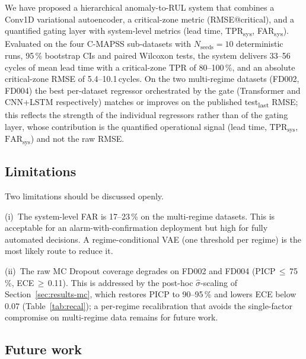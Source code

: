 \documentclass[5p,times,authoryear]{elsarticle}
\begin{document}
We have proposed a hierarchical anomaly-to-RUL system that combines a Conv1D variational autoencoder, a critical-zone metric (RMSE@critical), and a quantified gating layer with system-level metrics (lead time, TPR\textsubscript{sys}, FAR\textsubscript{sys}). Evaluated on the four C-MAPSS sub-datasets with $N_{\mathrm{seeds}}{=}10$ deterministic runs, 95\,\% bootstrap CIs and paired Wilcoxon tests, the system delivers 33--56\,cycles of mean lead time with a critical-zone TPR of 80--100\,\%, and an absolute critical-zone RMSE of 5.4--10.1\,cycles. On the two multi-regime datasets (FD002, FD004) the best per-dataset regressor orchestrated by the gate (Transformer and CNN+LSTM respectively) matches or improves on the published test\textsubscript{last} RMSE; this reflects the strength of the individual regressors rather than of the gating layer, whose contribution is the quantified operational signal (lead time, $\mathrm{TPR}_{\mathrm{sys}}$, $\mathrm{FAR}_{\mathrm{sys}}$) and not the raw RMSE.

\subsection{Limitations}\label{sec:limitations}

Two limitations should be discussed openly.

(i)~The system-level FAR is 17--23\,\% on the multi-regime datasets. This is acceptable for an alarm-with-confirmation deployment but high for fully automated decisions. A regime-conditional VAE (one threshold per regime) is the most likely route to reduce it.

(ii)~The raw MC Dropout coverage degrades on FD002 and FD004 (PICP\,$\le$\,75\,\%, ECE\,$\ge$\,0.11). This is addressed by the post-hoc $\hat\sigma$-scaling of Section~\ref{sec:results-mc}, which restores PICP to 90--95\,\% and lowers ECE below 0.07 (Table~\ref{tab:recal}); a per-regime recalibration that avoids the single-factor compromise on multi-regime data remains for future work.

\subsection{Future work}\label{sec:futurework}
\end{document}
